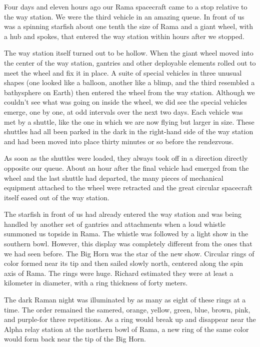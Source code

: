 \documentclass[]{article}
\begin{document}
{Four days and eleven hours ago our Rama spacecraft came to a stop relative to the way station. We were the third vehicle in an amazing queue. In front of us was a spinning starfish about one tenth the size of Rama and a giant wheel, with a hub and spokes, that entered the way station within hours after we stopped.

The way station itself turned out to be hollow. When the giant wheel moved into the center of the way station, gantries and other deployable elements rolled out to meet the wheel and fix it in place. A suite of special vehicles in three unusual shapes (one looked like a balloon, another like a blimp, and the third resembled a bathysphere on Earth) then entered the wheel from the way station. Although we couldn’t see what was going on inside the wheel, we did see the special vehicles emerge, one by one, at odd intervals over the next two days. Each vehicle was met by a shuttle, like the one in which we are now flying but larger in size. These shuttles had all been parked in the dark in the right-hand side of the way station and had been moved into place thirty minutes or so before the rendezvous.

As soon as the shuttles were loaded, they always took off in a direction directly opposite our queue. About an hour after the final vehicle had emerged from the wheel and the last shuttle had departed, the many pieces of mechanical equipment attached to the wheel were retracted and the great circular spacecraft itself eased out of the way station.

The starfish in front of us had already entered the way station and was being handled by another set of gantries and attachments when a loud whistle summoned us topside in Rama. The whistle was followed by a light show in the southern bowl. However, this display was completely different from the ones that we had seen before. The Big Horn was the star of the new show. Circular rings of color formed near its tip and then sailed slowly north, centered along the spin axis of Rama. The rings were huge. Richard estimated they were at least a kilometer in diameter, with a ring thickness of forty meters.

The dark Raman night was illuminated by as many as eight of these rings at a time. The order remained the samered, orange, yellow, green, blue, brown, pink, and purple-for three repetitions. As a ring would break up and disappear near the Alpha relay station at the northern bowl of Rama, a new ring of the same color would form back near the tip of the Big Horn.

}
\end{document}
